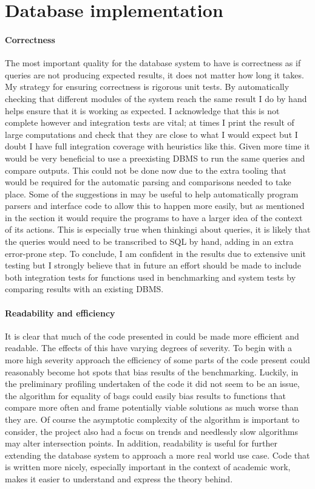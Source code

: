 \section{Database implementation} %
\paragraph{Correctness} The most important quality for the database system to
have is correctness as if queries are not producing expected results, it does
not matter how long it takes. My strategy for ensuring correctness is rigorous
unit tests. By automatically checking that different modules of the system reach
the same result I do by hand helps ensure that it is working as expected. I
acknowledge that this is not complete however and integration tests are vital;
at times I print the result of large computations and check that they are close
to what I would expect but I doubt I have full integration coverage with
heuristics like this. Given more time it would be very beneficial to use a
preexisting DBMS to run the same queries and compare outputs. This could not be
done now due to the extra tooling that would be required for the automatic
parsing and comparisons needed to take place. Some of the suggestions in
 may be useful to help automatically
program parsers and interface code to allow this to happen more easily, but as
mentioned in the section it would require the programs to have a larger idea of
the context of its actions. This is especially true when thinkingi about
queries, it is likely that the queries would need to be transcribed to SQL by
hand, adding in an extra error-prone step. To conclude, I am confident in the
results due to extensive unit testing but I strongly believe that in future an
effort should be made to include both integration tests for functions used in
benchmarking and system tests by comparing results with an existing DBMS.

\paragraph{Readability and efficiency} It is clear that much of the code
presented in  could be made more efficient and
readable. The effects of this have varying degrees of severity. To begin with a
more high severity approach the efficiency of some parts of the code present
could reasonably become hot spots that bias results of the benchmarking.
Luckily, in the preliminary profiling undertaken of the code it did not seem to
be an issue, the algorithm for equality of bags could easily bias results to
functions that compare more often and frame potentially viable solutions as much
worse than they are. Of course the asymptotic complexity of the algorithm is
important to consider, the project also had a focus on trends and needlessly
slow algorithms may alter intersection points. In addition, readability is useful for further extending the
database system to approach a more real world use case. Code that
is written more nicely, especially important in the context of academic work,
makes it easier to understand and express the theory behind.
